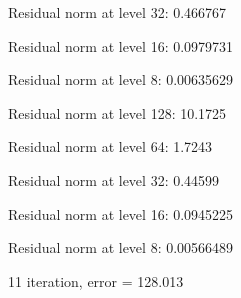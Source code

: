 \documentclass[UTF8]{ctexart}
\begin{document}
\begin{enumerate}
    Residual norm at level 32: 0.466767

    Residual norm at level 16: 0.0979731

    Residual norm at level 8: 0.00635629

    Residual norm at level 128: 10.1725

    Residual norm at level 64: 1.7243

    Residual norm at level 32: 0.44599

    Residual norm at level 16: 0.0945225

    Residual norm at level 8: 0.00566489

    11 iteration, error = 128.013
\end{enumerate}
    









\end{document}
